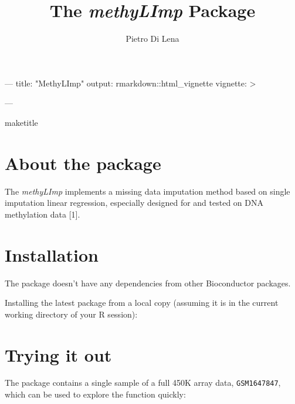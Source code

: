  
---
title: "MethyLImp"
output: rmarkdown::html_vignette
vignette: >
  \usepackage[utf8]{inputenc}
---

\newcommand{\Rfunction}[1]{{\texttt{#1}}}
\newcommand{\Robject}[1]{{\texttt{#1}}}
\newcommand{\Rpackage}[1]{{\textit{#1}}}
\newcommand{\Rclass}[1]{{\textit{#1}}}

\title{The \Rpackage{methyLImp} Package}
\author{Pietro Di Lena}

maketitle
\section{ About the package }
The \Rpackage{methyLImp} implements a missing data imputation method based on single imputation linear regression,
especially designed for and tested on DNA methylation data [1].

\section{Installation}

The package doesn't have any dependencies from other Bioconductor packages.

Installing the latest package from a local copy (assuming it is in the current working
directory of your R session):

\begin{knitrout}
\color{fgcolor}\begin{kframe}
\begin{alltt}
\hlstd{(}\hlstd{,} \hlstd{=}\hlstd{,} \hlstd{=}\hlstd{)}
\end{alltt}
\end{kframe}
\end{knitrout}

\section{Trying it out}
The package contains a single sample of a full 450K array data, \Robject{GSM1647847}, which can be used to explore the function quickly:

